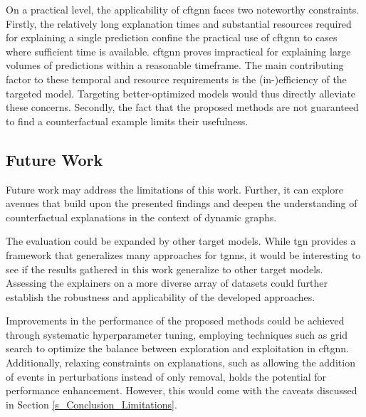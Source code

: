 On a practical level, the applicability of \gls{cftgnn} faces two noteworthy constraints. Firstly, the relatively long explanation times and substantial resources required for explaining a single prediction confine the practical use of \gls{cftgnn} to cases where sufficient time is available. \gls{cftgnn} proves impractical for explaining large volumes of predictions within a reasonable timeframe. The main contributing factor to these temporal and resource requirements is the (in-)efficiency of the targeted model. Targeting better-optimized models would thus directly alleviate these concerns. Secondly, the fact that the proposed methods are not guaranteed to find a counterfactual example limits their usefulness. 





\subsection{Future Work}
\label{s_Conclusion_FutureWork}

Future work may address the limitations of this work. Further, it can explore avenues that build upon the presented findings and deepen the understanding of counterfactual explanations in the context of dynamic graphs. 

The evaluation could be expanded by other target models. While \gls{tgn} provides a framework that generalizes many approaches for \glspl{tgnn}, it would be interesting to see if the results gathered in this work generalize to other target models. Assessing the explainers on a more diverse array of datasets could further establish the robustness and applicability of the developed approaches.

Improvements in the performance of the proposed methods could be achieved through systematic hyperparameter tuning, employing techniques such as grid search to optimize the balance between exploration and exploitation in \gls{cftgnn}. 
Additionally, relaxing constraints on explanations, such as allowing the addition of events in perturbations instead of only removal, holds the potential for performance enhancement. However, this would come with the caveats discussed in Section \ref{s_Conclusion_Limitations}.

